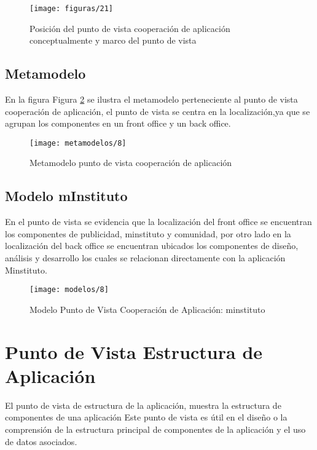 \begin{figure}[H]
	\centering
	\texttt{[image: figuras/21]}
	\captionsetup{width=.95\textwidth}
	\caption{Posición del punto de vista cooperación de aplicación conceptualmente y marco del punto de vista \cite{ref9}}
	\label{figura21}
\end{figure}

\subsection{Metamodelo}
En la figura Figura \ref{metamodelo8} se ilustra el metamodelo perteneciente al punto de vista cooperación de aplicación, el punto de vista se centra en la localización,ya que se agrupan los componentes en un front office y un back office. \cite{ref9}

\begin{figure}[H]
	\centering
	\texttt{[image: metamodelos/8]}
	\captionsetup{width=.95\textwidth}
	\caption{Metamodelo punto de vista cooperación de aplicación \cite{ref9}}
	\label{metamodelo8}
\end{figure}

\subsection{Modelo mInstituto}
En el punto de vista se evidencia que la localización del front office se encuentran los componentes de publicidad, minstituto y comunidad, por otro lado en la localización del back office se encuentran ubicados los componentes de diseño, análisis y desarrollo los cuales se relacionan directamente con la aplicación Minstituto.

\begin{figure}[H]
	\centering
	\texttt{[image: modelos/8]}
	\captionsetup{width=.95\textwidth}
	\caption{Modelo Punto de Vista Cooperación de Aplicación: minstituto}
	\label{modelo8}
\end{figure}

\section{Punto de Vista Estructura de Aplicación}
El punto de vista de estructura de la aplicación, muestra la estructura de componentes de una aplicación Este punto de vista es útil en el diseño o la comprensión de la estructura principal de componentes de la aplicación y el uso de datos asociados. \cite{ref9}

